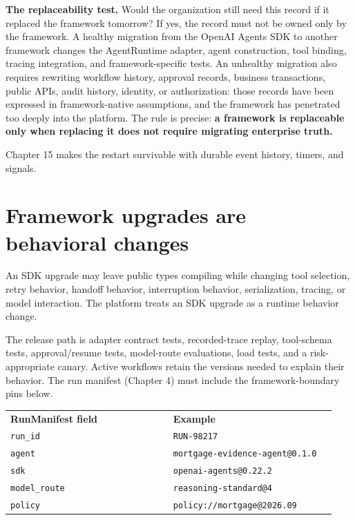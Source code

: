 \textbf{The replaceability test.} Would the organization still need this record if it replaced the framework tomorrow? If yes, the record must not be owned only by the framework. A healthy migration from the OpenAI Agents SDK to another framework changes the AgentRuntime adapter, agent construction, tool binding, tracing integration, and framework-specific tests. An unhealthy migration also requires rewriting workflow history, approval records, business transactions, public APIs, audit history, identity, or authorization: those records have been expressed in framework-native assumptions, and the framework has penetrated too deeply into the platform. The rule is precise: \textbf{a framework is replaceable only when replacing it does not require migrating enterprise truth.}\par

Chapter 15 makes the restart survivable with durable event history, timers, and signals.\par

\section{Framework upgrades are behavioral changes}

An SDK upgrade may leave public types compiling while changing tool selection, retry behavior, handoff behavior, interruption behavior, serialization, tracing, or model interaction. The platform treats an SDK upgrade as a runtime behavior change.\par

The release path is adapter contract tests, recorded-trace replay, tool-schema tests, approval/resume tests, model-route evaluations, load tests, and a risk-appropriate canary. Active workflows retain the versions needed to explain their behavior. The run manifest (Chapter 4) must include the framework-boundary pins below.\par

\BookTableStart
\small
\begin{tabular}{@{}Y{0.4700\linewidth}Y{0.4700\linewidth}@{}}
\color{white}\bfseries RunManifest field & \color{white}\bfseries Example \\
\lstinline[style=bookinline]!run_id! & \lstinline[style=bookinline]!RUN-98217! \\
\lstinline[style=bookinline]!agent! & \lstinline[style=bookinline]!mortgage-evidence-agent@0.1.0! \\
\lstinline[style=bookinline]!sdk! & \lstinline[style=bookinline]!openai-agents@0.22.2! \\
\lstinline[style=bookinline]!model_route! & \lstinline[style=bookinline]!reasoning-standard@4! \\
\lstinline[style=bookinline]!policy! & \lstinline[style=bookinline]!policy://mortgage@2026.09! \\
\end{tabular}
\BookTableEnd


